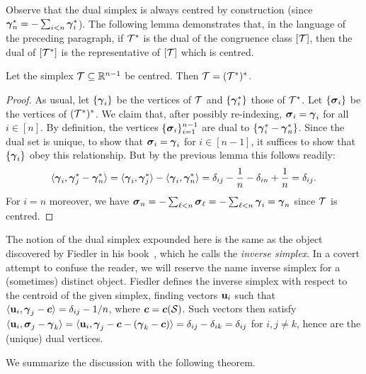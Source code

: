 Observe that the dual simplex is always centred by construction (since $\vb*{\gamma}^*_n=-\sum_{i<n}\vb*{\gamma}^*_i$).  The following lemma demonstrates that, in the language of the preceding paragraph, if $\mathcal{T}^*$ is the dual of the congruence class $[\mathcal{T}]$, then the dual of $[\mathcal{T}^*]$ is the representative of $[\mathcal{T}]$ which is centred. 


\begin{lemma}
	\label{lem:dual_of_dual}
	Let the simplex $\mathcal{T}\subseteq\mathbb{R}^{n-1}$  be centred.  Then $\mathcal{T}=(\mathcal{T}^*)^*$. 
\end{lemma}
\begin{proof}
	As usual, let $\{\vb*{\gamma}_i\}$ be the vertices  of $\mathcal{T}$ and  $\{\vb*{\gamma}_i^*\}$ those of $\mathcal{T}^*$. Let $\{\vb*{\sigma}_i\}$ be the vertices of $(\mathcal{T}^*)^*$. We claim that, after possibly  re-indexing, $\vb*{\sigma}_i=\vb*{\gamma}_i$ for all $i\in[n]$. By definition, the vertices $\{\vb*{\sigma}_i\}_{i=1}^{n-1}$ are  dual  to $\{\vb*{\gamma}^*_i-\vb*{\gamma}^
	*_n\}$. Since the dual set is unique, to show  that  $\vb*{\sigma}_i  = \vb*{\gamma}_i$ for $i\in[n-1]$, it suffices  to  show that  $\{\vb*{\gamma}_i\}$ obey 
	this  relationship.  But by the previous lemma  this follows readily: 
	\begin{equation*}
	\langle \vb*{\gamma}_i,\vb*{\gamma}_j^*-\vb*{\gamma}_n^*\rangle = \langle \vb*{\gamma}_i,\vb*{\gamma}_j^*\rangle - \langle \vb*{\gamma}_i,\vb*{\gamma}_n^*\rangle = \delta_{ij} - \frac{1}{n} - \delta_{in} + \frac{1}{n}  =\delta_{ij}.  
	\end{equation*}
	For $i=n$ moreover, we  have $\vb*{\sigma}_n  = -\sum_{\ell<n}\vb*{\sigma}_\ell = -\sum_{\ell<n} \vb*{\gamma}_i=\vb*{\gamma}_n$  since $\mathcal{T}$ is  centred. 
\end{proof}

\begin{remark}
	The notion of the dual simplex expounded here is the same as the object discovered by Fiedler in his book~\cite[Chapter 5]{fiedler2011matrices}, which he calls the \emph{inverse simplex}. In a covert attempt to confuse the reader, we will reserve the name inverse simplex for a (sometimes) distinct object. Fiedler defines the inverse simplex with respect to the centroid of the given simplex, finding vectors $\vb{u}_i$ such that $\langle \vb{u}_i,\vb*{\gamma}_j-\vb*{c}\rangle = \delta_{ij}-1/n$, where $\vb*{c}=\vb*{c}(\mathcal{S})$.  Such vectors then satisfy $\langle \vb{u}_i,\vb*{\sigma}_j-\vb*{\gamma}_k\rangle = \langle \vb{u}_i,\vb*{\gamma}_j-\vb*{c}-(\vb*{\gamma}_k-\vb*{c})\rangle = \delta_{ij}-\delta_{ik}=\delta_{ij}$ for $i,j\neq k$, hence are the (unique) dual vertices. 
\end{remark}

We summarize the discussion with the following theorem. 

